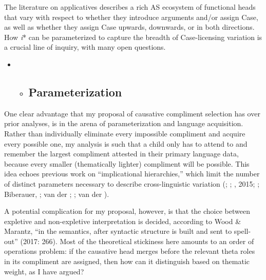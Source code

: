 \documentclass[output=paper,modfonts,nonflat]{langsci/langscibook}
\begin{document}
The literature on applicatives describes a rich AS ecosystem of functional heads that vary with respect to whether they introduce arguments and/or assign Case, as well as whether they assign Case upwards, downwards, or in both directions. How \textit{i}* can be parameterized to capture the breadth of Case-licensing variation is a crucial line of inquiry, with many open questions.


\begin{itemize}
\item \begin{itemize}
\item \subsection{Parameterization} 
\end{itemize}
\end{itemize}

One clear advantage that my proposal of causative compliment selection has over prior analyses, is in the arena of parameterization and language acquisition. Rather than individually eliminate every impossible compliment and acquire every possible one, my analysis is such that a child only has to attend to and remember the largest compliment attested in their primary language data, because every smaller (thematically lighter) compliment will be possible. This idea echoes previous work on “implicational hierarchies,” which limit the number of distinct parameters necessary to describe cross-linguistic variation (\citealt{HolmbergRoberts2009}; \citealt{Biberauer2011}; \citealt{BiberauerRoberts2012}, 2015; \citealt{Sheehan2013}; Biberauer, \citealt{RobertsSheehan2013}; van der \citealt{WalBiberauer2014}; \citealt{BiberauerEtAl2014}; van der \citealt{Wal2017}).

A potential complication for my proposal, however, is that the choice between expletive and non-expletive interpretation is decided, according to Wood \& Marantz, “in the semantics, after syntactic structure is built and sent to spell-out” (2017: 266). Most of the theoretical stickiness here amounts to an order of operations problem: if the causative head merges before the relevant theta roles in its compliment are assigned, then how can it distinguish based on thematic weight, as I have argued? 
\end{document}
